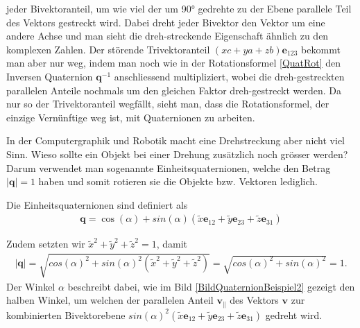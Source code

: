 jeder Bivektoranteil, um wie viel der um 90° gedrehte zu der Ebene parallele Teil des Vektors gestreckt wird. Dabei dreht jeder Bivektor den Vektor um eine andere Achse und man sieht die dreh-streckende Eigenschaft ähnlich zu den komplexen Zahlen. Der störende Trivektoranteil $(xc+ya+zb)\mathbf{e}_{123}$ bekommt man aber nur weg, indem man noch wie in der Rotationsformel \eqref{QuatRot} den Inversen Quaternion $\mathbf{q}^{-1}$ anschliessend multipliziert, wobei die dreh-gestreckten parallelen Anteile nochmals um den gleichen Faktor dreh-gestreckt werden. Da nur so der Trivektoranteil wegfällt, sieht man, dass die Rotationsformel, der einzige Vernünftige weg ist, mit Quaternionen zu arbeiten.

In der Computergraphik und Robotik macht eine Drehstreckung aber nicht viel Sinn. Wieso sollte ein Objekt bei einer Drehung zusätzlich noch grösser werden? Darum verwendet man sogenannte Einheitsquaternionen, welche den Betrag $|\mathbf{q}|=1$ haben und somit rotieren sie die Objekte bzw. Vektoren lediglich.
\begin{definition}
	Die Einheitsquaternionen sind definiert als
	\begin{align}
		\mathbf{q} = \cos(\alpha) + sin(\alpha)(\tilde{x}\mathbf{e}_{12} + \tilde{y}\mathbf{e}_{23} + \tilde{z}\mathbf{e}_{31})
	\end{align}
\end{definition}
Zudem setzten wir $\tilde{x}^2+\tilde{y}^2+\tilde{z}^2=1$, damit
\begin{align}
	|\mathbf{q}| = \sqrt{cos(\alpha)^2 + sin(\alpha)^2(\tilde{x}^2+\tilde{y}^2+\tilde{z}^2) } = \sqrt{cos(\alpha)^2 + sin(\alpha)^2} = 1.
\end{align}
Der Winkel $\alpha$ beschreibt dabei, wie im Bild \ref{BildQuaternionBeispiel2} gezeigt den halben Winkel, um welchen der parallelen Anteil $\mathbf{v_{\parallel}}$ des Vektors $\mathbf{v}$ zur kombinierten Bivektorebene $sin(\alpha)^2(\tilde{x}\mathbf{e}_{12} + \tilde{y}\mathbf{e}_{23} + \tilde{z}\mathbf{e}_{31})$ gedreht wird.

